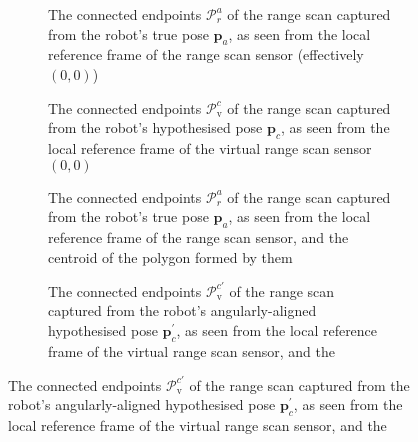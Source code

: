 \begin{figure}\centering
    \begin{subfigure}[t]{0.475\linewidth} \centering
        \hspace{0.5cm}
        \vspace{1em}
        \caption{\small The connected endpoints $\mathcal{P}_r^a$ of the range
                 scan captured from the robot's true pose $\bm{p}_a$, as seen
                 from the local reference frame of the range scan sensor
                 (effectively $(0,0)$)}
        \label{fig:pr1}
    \end{subfigure}
    \hfill
    \begin{subfigure}[t]{0.475\linewidth} \centering
        \hspace{0.5cm}
        \vspace{1em}
        \caption{\small The connected endpoints $\mathcal{P}_\text{v}^c$ of the
                 range scan captured from the robot's hypothesised pose
                 $\bm{p}_c$, as seen from the local reference frame of the
                 virtual range scan sensor $(0,0)$}
        \label{fig:pv1}
    \end{subfigure}
    \begin{subfigure}[t]{0.475\linewidth} \centering
        \hspace{0.5cm}
        \vspace{1em}
        \caption {\small The connected endpoints $\mathcal{P}_r^a$ of the range
                  scan captured from the robot's true pose $\bm{p}_a$, as seen
                  from the local reference frame of the range scan sensor, and
                  the centroid of the polygon formed by them}
        \label{fig:pr2}
    \end{subfigure}
    \hfill
    \begin{subfigure}[t]{0.475\linewidth} \centering
        \hspace{0.5cm}
        \vspace{1em}
        \caption{\small The connected endpoints $\mathcal{P}_\text{v}^{c\prime}$
                 of the range scan captured from the robot's angularly-aligned
                 hypothesised pose $\bm{p}_c^\prime$, as seen from the local
                 reference frame of the virtual range scan sensor, and the
}
\end{subfigure}
\end{figure}
